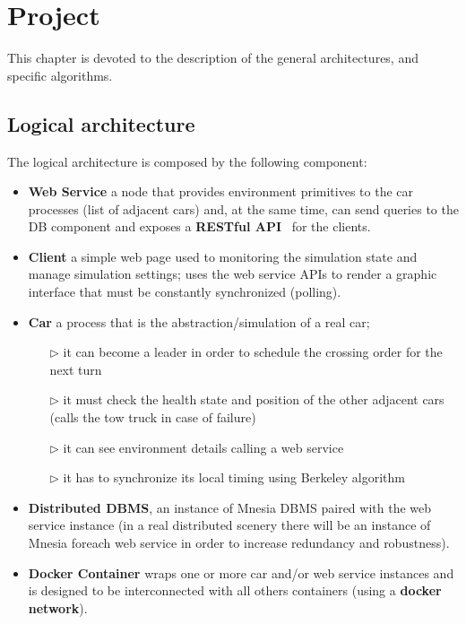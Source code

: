 \chapter{Project}\label{ch:project}

This chapter is devoted to the description of the general architectures, 
and specific algorithms.


\section{Logical architecture}

The logical architecture is composed by the following component:
\begin{itemize}
    \item \textbf{Web Service} a node that provides environment primitives to the 
        car processes (list of adjacent cars) and, at the same time, 
        can send queries to the DB component and exposes a \textbf{RESTful API}~\cite{9} 
        for the clients.
    \item \textbf{Client} a simple web page used to monitoring the simulation state
        and manage simulation settings; uses the web service APIs to render a 
        graphic interface that must be constantly synchronized (polling).
    \item \textbf{Car} a process that is the abstraction/simulation of a real car; 
        \begin{itemize}
            \item[$\rhd$] it can become a leader in order to schedule the crossing 
                order for the next turn
            \item[$\rhd$] it must check the health state and position of the other adjacent cars 
                (calls the tow truck in case of failure)
            \item[$\rhd$] it can see environment details calling a web service 
            \item[$\rhd$] it has to synchronize its local timing using Berkeley algorithm
        \end{itemize}
    \item \textbf{Distributed DBMS}, an instance of Mnesia DBMS paired 
        with the web service instance 
        (in a real distributed scenery there will be an instance of Mnesia 
        foreach web service in order to increase redundancy and robustness). 
    \item \textbf{Docker Container} wraps one or more car and/or web service instances 
        and is designed to be interconnected with all others containers 
        (using a \textbf{docker network}). 
    \end{itemize}


